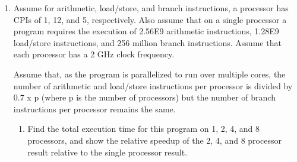 \documentclass[10pt]{article}
\begin{document}
\begin{enumerate}
    \item Assume for arithmetic, load/store, and branch instructions, a processor has CPIs of 1, 12, and 5, respectively. Also assume that on a single processor a program requires the execution of 2.56E9 arithmetic instructions, 1.28E9 load/store instructions, and 256 million branch instructions. Assume that each processor has a 2 GHz clock frequency.

    Assume that, as the program is parallelized to run over multiple cores, the number of arithmetic and load/store instructions per processor is divided by 0.7 x p (where p is the number of processors) but the number of branch instructions per processor remains the same.
    \begin{enumerate}
        \item 
        Find the total execution time for this program on 1, 2, 4, and 8 processors, and show the relative speedup of the 2, 4, and 8 processor result relative to the single processor result.


\end{enumerate}
\end{enumerate}
\end{document}
